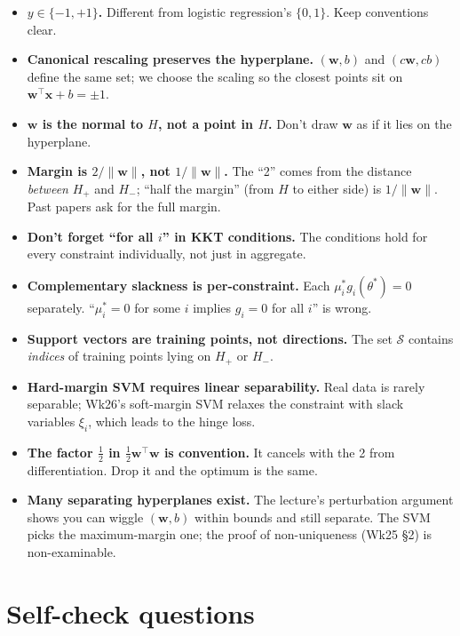 \documentclass[11pt, a4paper]{article}
\begin{document}
\begin{itemize}
  \item \textbf{$y \in \{-1, +1\}$.} Different from logistic regression's $\{0, 1\}$. Keep conventions clear.
  \item \textbf{Canonical rescaling preserves the hyperplane.} $(\mathbf{w}, b)$ and $(c\mathbf{w}, cb)$ define the same set; we choose the scaling so the closest points sit on $\mathbf{w}^\top\mathbf{x} + b = \pm 1$.
  \item \textbf{$\mathbf{w}$ is the normal to $H$, not a point in $H$.} Don't draw $\mathbf{w}$ as if it lies on the hyperplane.
  \item \textbf{Margin is $2/\|\mathbf{w}\|$, not $1/\|\mathbf{w}\|$.} The ``2'' comes from the distance \emph{between} $H_+$ and $H_-$; ``half the margin'' (from $H$ to either side) is $1/\|\mathbf{w}\|$. Past papers ask for the full margin.
  \item \textbf{Don't forget ``for all $i$'' in KKT conditions.} The conditions hold for every constraint individually, not just in aggregate.
  \item \textbf{Complementary slackness is per-constraint.} Each $\mu_i^* g_i(\theta^*) = 0$ separately. ``$\mu_i^* = 0$ for some $i$ implies $g_i = 0$ for all $i$'' is wrong.
  \item \textbf{Support vectors are training points, not directions.} The set $\mathcal{S}$ contains \emph{indices} of training points lying on $H_+$ or $H_-$.
  \item \textbf{Hard-margin SVM requires linear separability.} Real data is rarely separable; Wk26's soft-margin SVM relaxes the constraint with slack variables $\xi_i$, which leads to the hinge loss.
  \item \textbf{The factor $\tfrac{1}{2}$ in $\tfrac{1}{2}\mathbf{w}^\top\mathbf{w}$ is convention.} It cancels with the 2 from differentiation. Drop it and the optimum is the same.
  \item \textbf{Many separating hyperplanes exist.} The lecture's perturbation argument shows you can wiggle $(\mathbf{w}, b)$ within bounds and still separate. The SVM picks the maximum-margin one; the proof of non-uniqueness (Wk25 §2) is non-examinable.
\end{itemize}

\section*{Self-check questions}
\end{document}
